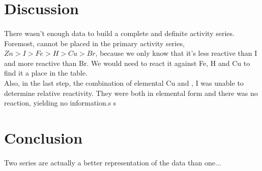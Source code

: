 \documentclass[fleqn,titlepage]{article}
\begin{document}
\section*{Discussion}
\paragraph{} There wasn't enough data to build a complete and definite activity series. Foremost,  cannot be placed in the primary activity series, $Zn > I > Fe > H > Cu > Br$, because we only know that it's less reactive than I and more reactive than Br. We would need to react it against Fe, H and Cu to find it a place in the table. \\
Also, in the last step, the combination of elemental Cu and , I was unable to determine relative reactivity. They were both in elemental form and there was no reaction, yielding no information.s
s
\section*{Conclusion}
  \paragraph{} Two series are actually a better representation of the data than one...
\end{document}
